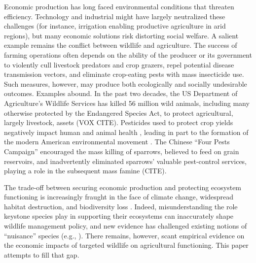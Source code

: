

Economic production has long faced environmental conditions that threaten efficiency. Technology and industrial might have largely neutralized these challenges (for instance, irrigation enabling productive agriculture in arid regions), but many economic solutions risk distorting social welfare. A salient example remains the conflict between wildlife and agriculture. The success of farming operations often depends on the ability of the producer or its government to violently cull livestock predators and crop grazers, repel potential disease transmission vectors, and eliminate crop-eating pests with mass insecticide use. Such measures, however, may produce both ecologically and socially undesirable outcomes. Examples abound. In the past two decades, the US Department of Agriculture's Wildlife Services has killed 56 million wild animals, including many otherwise protected by the Endangered Species Act, to protect agricultural, largely livestock, assets (VOX CITE). Pesticides used to protect crop yields negatively impact human and animal health \citep{larsen_agricultural_2017}, leading in part to the formation of the modern American environmental movement \citep{woodwell_broken_1984}. The Chinese ``Four Pests Campaign'' encouraged the mass killing of sparrows, believed to feed on grain reservoirs, and inadvertently eliminated sparrows' valuable pest-control services, playing a role in the subsequent mass famine (CITE). 

The trade-off between securing economic production and protecting ecosystem functioning is increasingly fraught in the face of climate change, widespread habitat destruction, and biodiversity loss \citep{cardinale_biodiversity_2012}. Indeed, misunderstanding the role keystone species play in supporting their ecosystems can inaccurately shape wildlife management policy, and new evidence has challenged existing notions of ``nuisance'' species (e.g., \cite{raynor_wolves_2021}). There remains, however, scant empirical evidence on the economic impacts of targeted wildlife on agricultural functioning. This paper attempts to fill that gap.

